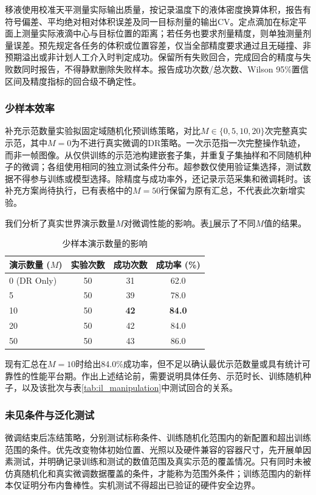 移液使用校准天平测量实际输出质量，按记录温度下的液体密度换算体积，报告有符号偏差、平均绝对相对体积误差及同一目标剂量的输出CV。定点滴加在标定平面上测量实际液滴中心与目标位置的距离；若任务也要求剂量精度，则单独测量剂量误差。预先规定各任务的体积或位置容差，仅当全部精度要求通过且无碰撞、非预期溢出或非计划人工介入时判定成功。保留所有失败回合，完成回合的精度与失败数同时报告，不得静默删除失败样本。报告成功次数/总次数、Wilson 95\%置信区间及精度指标的回合级不确定性。

\subsubsection{少样本效率}
\label{subsec:few_shot}

补充示范数量实验拟固定域随机化预训练策略，对比$M\in\{0,5,10,20\}$次完整真实示范，其中$M=0$为不进行真实微调的DR策略。一次示范指一次完整操作轨迹，而非一帧图像。从仅供训练的示范池构建嵌套子集，并重复子集抽样和不同随机种子的微调；各组使用相同的独立测试条件分布。超参数仅使用验证集选择，测试数据不得参与训练或模型选择。除精度与成功率外，还记录示范采集和微调耗时。该补充方案尚待执行，已有表格中的$M=50$行保留为原有汇总，不代表此次新增实验。

我们分析了真实世界演示数量$M$对微调性能的影响。表\ref{tab:few_shot}展示了不同$M$值的结果。

\begin{table}[!t]
\renewcommand{\arraystretch}{1.3}
\caption{少样本演示数量的影响}
\label{tab:few_shot}
\centering
\begin{tabular}{lccc}
\hline\hline
\textbf{演示数量 ($M$)} & \textbf{实验次数} & \textbf{成功次数} & \textbf{成功率 (\%)} \\ \hline
0 (DR Only) & 50 & 31 & 62.0 \\
5 & 50 & 39 & 78.0 \\
10 & 50 & \textbf{42} & \textbf{84.0} \\
20 & 50 & 42 & 84.0 \\
50 & 50 & 43 & 86.0 \\ \hline\hline
\end{tabular}
\end{table}

现有汇总在$M=10$时给出84.0\%成功率，但不足以确认最优示范数量或具有统计可靠性的性能平台期。作出上述结论前，需要说明具体任务、示范时长、训练随机种子，以及该批次与表\ref{tab:il_manipulation}中测试回合的关系。

\subsubsection{未见条件与泛化测试}
\label{subsec:transfer_generalization}
微调结束后冻结策略，分别测试标称条件、训练随机化范围内的新配置和超出训练范围的条件。优先改变物体初始位置、光照以及硬件兼容的容器尺寸，先开展单因素测试，并明确记录训练和测试的数值范围及真实示范的覆盖情况。只有同时未被仿真随机化和真实微调数据覆盖的条件，才能称为范围外条件；训练范围内的新样本仅证明分布内鲁棒性。实机测试不得超出已验证的硬件安全边界。

